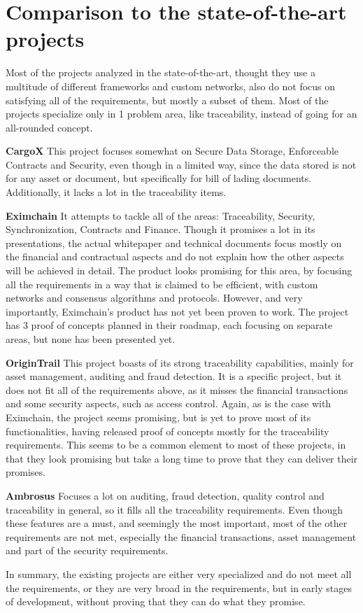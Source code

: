 
\section{Comparison to the state-of-the-art projects}
Most of the projects analyzed in the state-of-the-art, thought they use a multitude of different frameworks and custom networks, also do not focus on satisfying all of the requirements, but mostly a subset of them. Most of the projects specialize only in 1 problem area, like traceability, instead of going for an all-rounded concept.

\par \textbf{CargoX} This project focuses somewhat on Secure Data Storage, Enforceable Contracts and Security, even though in a limited way, since the data stored is not for any asset or document, but specifically for bill of lading documents. Additionally, it lacks a lot in the traceability items.

\par \textbf{Eximchain} It attempts to tackle all of the areas: Traceability, Security, Synchronization, Contracts and Finance. Though it promises a lot in its presentations, the actual whitepaper and technical documents focus mostly on the financial and contractual aspects and do not explain how the other aspects will be achieved in detail. The product looks promising for this area, by focusing all the requirements in a way that is claimed to be efficient, with custom networks and consensus algorithms and protocols. However, and very importantly, Eximchain's product has not yet been proven to work. The project has 3 proof of concepts planned in their roadmap, each focusing on separate areas, but none has been presented yet.

\par \textbf{OriginTrail} This project boasts of its strong traceability capabilities, mainly for asset management, auditing and fraud detection. It is a specific project, but it does not fit all of the requirements above,  as it misses the financial transactions and some security aspects, such as access control. Again, as is the case with Eximchain, the project seems promising, but is yet to prove most of its functionalities, having released proof of concepts mostly for the traceability requirements. This seems to be a common element to most of these projects, in that they look promising but take a long time to prove that they can deliver their promises.

\par \textbf{Ambrosus} Focuses a lot on auditing, fraud detection, quality control and traceability in general, so it fills all the traceability requirements. Even though these features are a must, and seemingly the most important, most of the other requirements are not met, especially the financial transactions, asset management and part of the security requirements.

In summary, the existing projects are either very specialized and do not meet all the requirements, or they are very broad in the requirements, but in early stages of development, without proving that they can do what they promise.